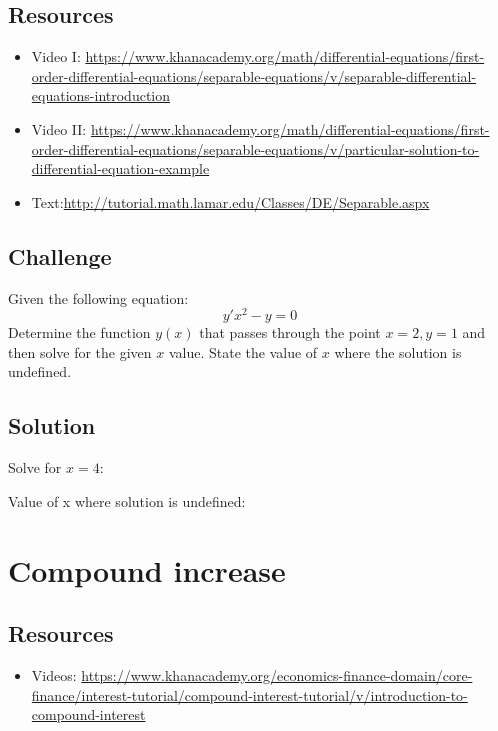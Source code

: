 \subsection*{Resources}
\begin{itemize}
    \item Video I: \url{https://www.khanacademy.org/math/differential-equations/first-order-differential-equations/separable-equations/v/separable-differential-equations-introduction} 
    \item Video II: \url{https://www.khanacademy.org/math/differential-equations/first-order-differential-equations/separable-equations/v/particular-solution-to-differential-equation-example}
    \item Text:\url{http://tutorial.math.lamar.edu/Classes/DE/Separable.aspx}
\end{itemize}

\subsection*{Challenge}
Given the following equation:
\begin{equation}
    y' x^2 - y = 0
\end{equation}
Determine the function $y(x)$ that passes through the point $x=2,y=1$ and then solve for the given $x$ value. State the value of $x$ where the solution is undefined. %

\subsection*{Solution}
Solve for $x=4$:

\six{}


Value of x where solution is undefined:

\six{}


\timebox



\newpage
\section{Compound increase}

\subsection*{Resources}
\begin{itemize}
    \item Videos: \url{https://www.khanacademy.org/economics-finance-domain/core-finance/interest-tutorial/compound-interest-tutorial/v/introduction-to-compound-interest}
\end{itemize}

